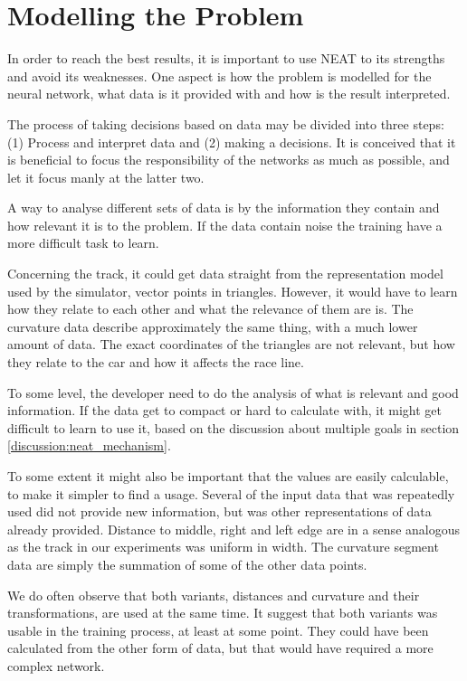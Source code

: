 \section{Modelling the Problem}

In order to reach the best results, it is important to use NEAT to its strengths and avoid its weaknesses. One aspect is how the problem is modelled for the neural network, what data is it provided with and how is the result interpreted.

The process of taking decisions based on data may be divided into three steps: (1) Process and interpret data and (2) making a decisions. It is conceived that it is beneficial to focus the responsibility of the networks as much as possible, and let it focus manly at the latter two. 


A way to analyse different sets of data is by the information they contain and how relevant it is to the problem. If the data contain noise the training have a more difficult task to learn.

Concerning the track, it could get data straight from the representation model used by the simulator, vector points in triangles. However, it would have to learn how they relate to each other and what the relevance of them are is. The curvature data describe approximately the same thing, with a much lower amount of data. The exact coordinates of the triangles are not relevant, but how they relate to the car and how it affects the race line. 

To some level, the developer need to do the analysis of what is relevant and good information. If the data get to compact or hard to calculate with, it might get difficult to learn to use it, based on the discussion about multiple goals in section \ref{discussion:neat_mechanism}.

To some extent it might also be important that the values are easily calculable, to make it simpler to find a usage. Several of the input data that was repeatedly used did not provide new information, but was other representations of data already provided. Distance to middle, right and left edge are in a sense analogous as the track in our experiments was uniform in width. The curvature segment data are simply the summation of some of the other data points.

We do often observe that both variants, distances and curvature and their transformations, are used at the same time. It suggest that both variants was usable in the training process, at least at some point. They could have been calculated from the other form of data, but that would have required a more complex network.

